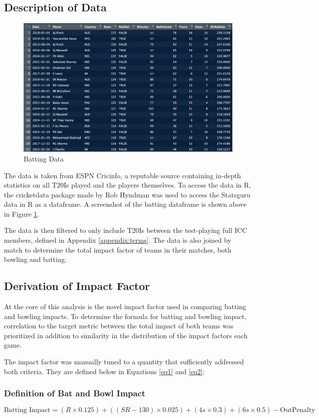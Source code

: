 \documentclass{article}[12pt]
\begin{document}
\subsection{Description of Data}
\begin{figure}[!h]
    \centering
    \includegraphics[width=0.5\linewidth]{batting_data.png}
    \caption{Batting Data}
    \label{fig:batting_data}
\end{figure}

 The data is taken from ESPN Cricinfo, a reputable source containing in-depth statistics on all T20Is played and the players themselves. \parencite{espn_2025_espncricinfo} To access the data in R, the cricketdata package made by Rob Hyndman \parencite{cricketdata} was used to access the Statsguru data in R as a dataframe. A screenshot of the batting dataframe is shown above in Figure \ref{fig:batting_data}.

The data is then filtered to only include T20Is between the test-playing full ICC members, defined in Appendix \ref{appendix:terms}. The data is also joined by match to determine the total impact factor of teams in their matches, both bowling and batting.

\subsection{Derivation of Impact Factor}

At the core of this analysis is the novel impact factor used in comparing batting and bowling impacts. To determine the formula for batting and bowling impact, correlation to the target metric between the total impact of both teams was prioritized in addition to similarity in the distribution of the impact factors each game.

The impact factor was manually tuned to a quantity that sufficiently addressed both criteria. They are defined below in Equations \ref{eq1} and \ref{eq2}:

\subsubsection{Definition of Bat and Bowl Impact}
\begin{equation}
    \text{Batting Impact} = (R \times 0.125) + ((SR - 130) \times 0.025) + (4s \times 0.3) + (6s \times 0.5) - \text{OutPenalty}
    \label{eq1}
\end{equation}
\end{document}
